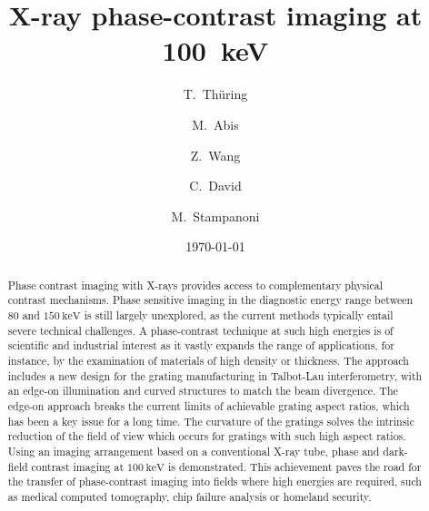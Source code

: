 \documentclass[aip,apl,amsmath,amssymb,floatfix,reprint,a4paper]{revtex4-1}
\begin{document}
\title{X-ray phase-contrast imaging at \SI{100}{\kilo\electronvolt}}

\author{T.~Thüring}
\author{M.~Abis}
\author{Z.~Wang}
\author{C.~David}
\author{M.~Stampanoni}

\date{\today}


\begin{abstract}
    Phase contrast imaging with X-rays provides access to
    complementary physical contrast mechanisms. Phase sensitive imaging in
    the diagnostic energy range between $80$ and
    $\SI{150}{\kilo\electronvolt}$ is still largely unexplored, as the
    current methods typically entail severe technical challenges. A
    phase-contrast technique at such high energies is of scientific and
    industrial interest as it vastly expands the range of applications, for
    instance, by the examination of materials of high density or thickness.
    The approach includes a new design for the grating manufacturing in
    Talbot-Lau interferometry, with an edge-on illumination and curved
    structures to match the beam divergence. The edge-on approach breaks the
    current limits of achievable grating aspect ratios, which has been a key
    issue for a long time. The curvature of the gratings solves the
    intrinsic reduction of the field of view which occurs for gratings with
    such high aspect ratios. Using an imaging arrangement based on a
    conventional X-ray tube, phase and dark-field contrast imaging at
    $\SI{100}{\kilo\electronvolt}$ is demonstrated. This achievement paves
    the road for the transfer of phase-contrast imaging into fields where
    high energies are required, such as medical computed tomography, chip
    failure analysis or homeland security.
\end{abstract}
\end{document}
